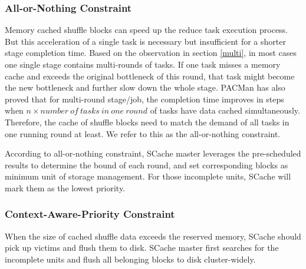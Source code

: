 \subsubsection{All-or-Nothing Constraint}
Memory cached shuffle blocks can speed up the reduce task execution process. But this acceleration of a single task is necessary but insufficient for a shorter stage completion time. Based on the observation in section \ref{multi}, in most cases one single stage contains multi-rounds of tasks. If one task misses a memory cache and exceeds the original bottleneck of this round, that task might become the new bottleneck and further slow down the whole stage. PACMan \cite{pacman} has also proved that for multi-round stage/job, the completion time improves in steps when $n\times number\ of\ tasks\ in\ one\ round$ of tasks have data cached simultaneously. Therefore, the cache of shuffle blocks need to match the demand of all tasks in one running round at least. We refer to this as the all-or-nothing constraint.

According to all-or-nothing constraint, SCache master leverages the pre-scheduled results to determine the bound of each round, and set corresponding blocks as minimum unit of storage management.
For those incomplete units, SCache will mark them as the lowest priority.

\subsubsection{Context-Aware-Priority Constraint}
When the size of cached shuffle data exceeds the reserved memory, SCache should pick up victims and flush them to disk.
SCache master first searches for the incomplete units and flush all belonging blocks to disk cluster-widely.

